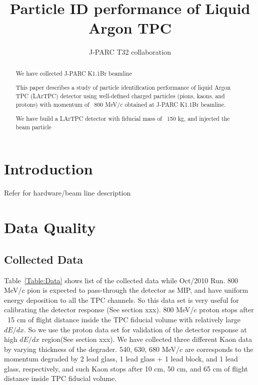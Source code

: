 \documentclass{cernyrep}
\begin{document}
\title{Particle ID performance of Liquid Argon TPC}
\author{J-PARC T32 collaboration}
\maketitle

\begin{abstract}

We have collected 
J-PARC K1.1Br beamline

This paper describes a study of particle identification performance of
liquid Argon TPC (LArTPC) detector using well-defined charged particles
(pions, kaons, and protons) with momentum of ~800 MeV/$c$
obtained at J-PARC K1.1Br beamline.

We have build a LArTPC detector with fiducial mass of ~150 kg,
and injected the beam particle

\end{abstract}

\section{Introduction}
Refer \cite{Araoka:2011pw} for hardware/beam line description

\section{Data Quality}
\subsection{Collected Data}

Table~\ref{Table:Data} shows list of the collected data while Oct/2010 Run.
800 MeV/$c$ pion is expected to pass-through the detector as MIP,
and have uniform energy deposition to all the TPC channels.
So this data set is very useful for calibrating the detector response (See section xxx).
800 MeV/$c$ proton stops after ~15 cm of flight distance inside the TPC fiducial volume
with relatively large $dE/dx$. So we use the proton data set for validation of the
detector response at high $dE/dx$ region(See section xxx).
We have collected three different Kaon data by varying thickness of the degrader. 
540, 630, 680 MeV/$c$ are corresponds to the momentum degraded by 
2 lead glass, 1 lead glass + 1 lead block, and 1 lead glass, respectively, 
and such Kaon stops after 10 cm, 50 cm, and 65 cm of flight distance inside TPC fiducial volume.
\end{document}
